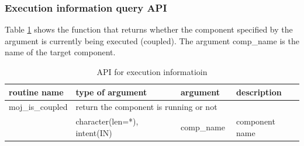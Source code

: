 \documentclass[11pt,a4paper]{report}
\newcommand{\tabref}[1]{Table \ref{#1}}
\begin{document}
\subsubsection{Execution information query API}
\tabref{table:moj_api_coupled} shows the function that returns whether the component specified by the argument is currently being executed (coupled). 
The argument comp\_name is the name of the target component.


\begin{table}[H]
\begin{center}
\caption{API for execution informatioin}
{\small
\label{table:moj_api_coupled}
\begin{tabular}{llll}
\hline\hline
routine name & type of argument & argument　& description \\
\hline
 moj\_is\_coupled &  \multicolumn{3}{l}{return the component is running or not}\\
           & character(len=*), intent(IN) & comp\_name  & component name\\
\hline\hline
\end{tabular}
}
\end{center}
\end{table}



\renewcommand{\chaptermark}[1]{%
\markboth{\appendixname \thechapter #1}{}}
\renewcommand{\sectionmark}[1]{%
\markright{\thesection\ #1 }}

\cleardoublepage

\pagestyle{empty}
\setcounter{page}{1}
\end{document}
